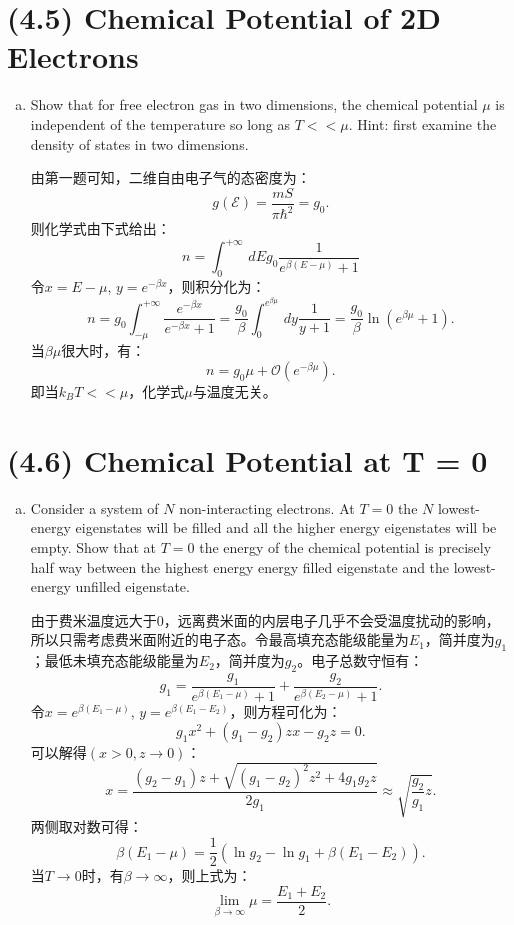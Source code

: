 \documentclass[reqno,a4paper,12pt]{amsart}
\begin{document}
\section{\textbf{(4.5) Chemical Potential of 2D Electrons}}
\begin{enumerate}[(a)]
	\item Show that for free electron gas in two dimensions, the chemical potential $\mu$ is independent of the temperature so long as $T<<\mu$. Hint: first examine the density of states in two dimensions. 
	\begin{tcolorbox}[breakable, colback = black!5!white, colframe = black]
	由第一题可知，二维自由电子气的态密度为：
	\[
		g(\mathcal{E}) = \frac{mS}{\pi\hbar^2} = g_0.
	\]
	则化学式由下式给出：
	\[
		n = \int_0^{+\infty} \,dE g_0\frac{1}{e^{\beta(E-\mu)}+1}
	\]
	令$x = E-\mu$, $y = e^{-\beta x}$，则积分化为：
	\[
		n = g_0 \int_{-\mu}^{+\infty} \frac{e^{-\beta x}}{e^{-\beta x} + 1} = \frac{g_0}{\beta}\int_0^{e^{\beta\mu}}\,dy \frac{1}{y+1} = \frac{g_0}{\beta}\ln(e^{\beta\mu}+1).
	\]
	当$\beta\mu$很大时，有：
	\[
		n = g_0\mu + \mathcal{O}(e^{-\beta\mu}).
	\]
	即当$k_BT<<\mu$，化学式$\mu$与温度无关。
	\end{tcolorbox}
\end{enumerate}

\section{\textbf{(4.6) Chemical Potential at T = 0}}
\begin{enumerate}[(a)]
	\item Consider a system of $N$ non-interacting electrons. At $T = 0$ the $N$ lowest-energy eigenstates will be filled and all the higher energy eigenstates will be empty. Show that at $T=0$ the energy of the chemical potential is precisely half way between the highest energy energy filled eigenstate and the lowest-energy unfilled eigenstate. 
	\begin{tcolorbox}[breakable, colback = black!5!white, colframe = black]
	由于费米温度远大于0，远离费米面的内层电子几乎不会受温度扰动的影响，所以只需考虑费米面附近的电子态。令最高填充态能级能量为$E_1$，简并度为$g_1$；最低未填充态能级能量为$E_2$，简并度为$g_2$。电子总数守恒有：
	\[
		g_1 = \frac{g_1}{e^{\beta(E_1-\mu)}+1} + \frac{g_2}{e^{\beta(E_2-\mu)}+1}.
	\]
	令$x = e^{\beta(E_1-\mu)}$, $y = e^{\beta(E_1-E_2)}$，则方程可化为：
	\[
		g_1x^2 + (g_1-g_2)z x - g_2z = 0.
	\]
	可以解得$(x>0,z\to 0)$：
	\[
		x = \frac{(g_2-g_1)z + \sqrt{(g_1-g_2)^2z^2+4g_1g_2z}}{2g_1} \approx \sqrt{\frac{g_2}{g_1}z}.
	\]
	两侧取对数可得：
	\[
		\beta(E_1-\mu) = \frac{1}{2}(\ln g_2 - \ln g_1 + \beta(E_1-E_2)).
	\]
	当$T\to 0$时，有$\beta\to\infty$，则上式为：
	\[
		\lim_{\beta\to\infty}\mu = \frac{E_1+E_2}{2}.
	\]
	\end{tcolorbox}
\end{enumerate}
\end{document}
